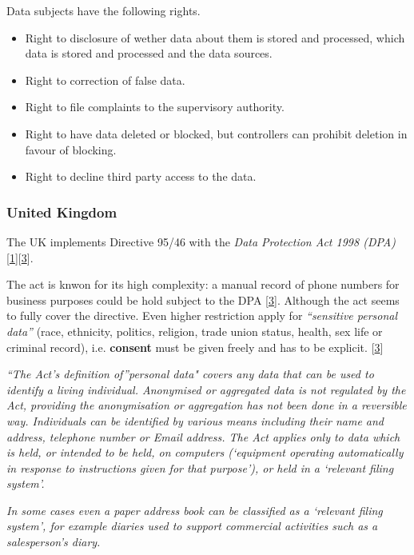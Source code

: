 Data subjects have the following rights.

\begin{itemize}
\item
Right to disclosure of wether data about them is stored and processed, which data is stored and processed and the data sources.
\item
Right to correction of false data.

\item
Right to file complaints to the supervisory authority.

\item
Right to have data deleted or blocked, but controllers can prohibit deletion in favour of blocking.

\item
Right to decline third party access to the data.
\end{itemize}

\subsubsection*{United Kingdom}

The UK implements Directive 95/46 with the \emph{Data Protection Act 1998 (DPA)} {[}\hyperref[references]{1}{]}{[}\hyperref[references]{3}{]}.

The act is knwon for its high complexity: a manual record of phone numbers for business purposes could be hold subject to the DPA {[}\hyperref[references]{3}{]}.
Although the act seems to fully cover the directive.
Even higher restriction apply for \emph{``sensitive personal data''} (race, ethnicity, politics, religion, trade union status, health, sex life or criminal record), i.e. \textbf{consent} must be given freely and has to be explicit. {[}\hyperref[references]{3}{]}

\emph{``The Act's definition of''personal data" covers any data that can be used to identify a living individual. Anonymised or aggregated data is not regulated by the Act, providing the anonymisation or aggregation has not been done in a reversible way.
Individuals can be identified by various means including their name and address, telephone number or
Email address.
The Act applies only to data which is held, or intended to be held, on computers (`equipment operating automatically in response to instructions given for that purpose'), or held in a `relevant filing system'.}

\emph{In some cases even a paper address book can be classified as a `relevant filing system', for example diaries used to support commercial activities such as a salesperson's diary.}

